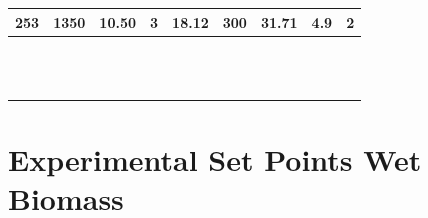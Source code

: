 \documentclass[11pt,twocolumn]{article}
\begin{document}
\begin{minipage}{\textwidth}
\begin{tabular}{ccccccccc}
253    &       1350 &     10.50 &             3 &     18.12 &       300 &       31.71 &                4.9 &           2 \\
\bottomrule
{}	&	{}	&	{}	&	{}	&	{}	&	{}	&	{}	&	{}	&	{}	\\
{}	&	{}	&	{}	&	{}	&	{}	&	{}	&	{}	&	{}	&	{}	\\
{}	&	{}	&	{}	&	{}	&	{}	&	{}	&	{}	&	{}	&	{}	\\
{}	&	{}	&	{}	&	{}	&	{}	&	{}	&	{}	&	{}	&	{}	\\
{}	&	{}	&	{}	&	{}	&	{}	&	{}	&	{}	&	{}	&	{}	\\
{}	&	{}	&	{}	&	{}	&	{}	&	{}	&	{}	&	{}	&	{}	\\
{}	&	{}	&	{}	&	{}	&	{}	&	{}	&	{}	&	{}	&	{}	\\
{}	&	{}	&	{}	&	{}	&	{}	&	{}	&	{}	&	{}	&	{}	\\
{}	&	{}	&	{}	&	{}	&	{}	&	{}	&	{}	&	{}	&	{}	\\
{}	&	{}	&	{}	&	{}	&	{}	&	{}	&	{}	&	{}	&	{}	\\
{}	&	{}	&	{}	&	{}	&	{}	&	{}	&	{}	&	{}	&	{}	\\
{}	&	{}	&	{}	&	{}	&	{}	&	{}	&	{}	&	{}	&	{}	\\

\end{tabular}
\end{minipage}


\section{Experimental Set Points Wet Biomass}
\label{app_wet_sp}
\end{document}
